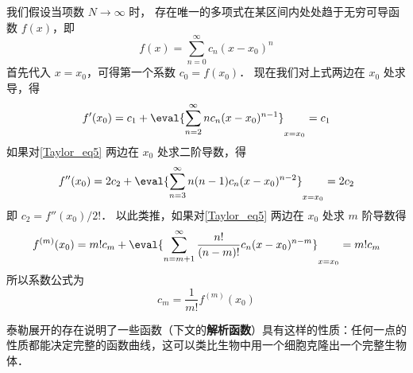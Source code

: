 我们假设当项数 $N \to \infty$ 时， 存在唯一的多项式在某区间内处处趋于无穷可导函数 $f(x)$，即
\begin{equation}\label{Taylor_eq5}
f(x) = \sum_{n = 0}^\infty  c_n (x - x_0)^n
\end{equation}
首先代入 $x = x_0$，可得第一个系数 $c_0 = f(x_0)$． 现在我们对上式两边在 $x_0$ 处求导，得
\begin{equation}
f'(x_0) = c_1 + \eval{ \sum_{n = 2}^\infty n c_n (x - x_0)^{n - 1} }_{x = x_0}  = c_1
\end{equation}
如果对\autoref{Taylor_eq5} 两边在 $x_0$ 处求二阶导数，得
\begin{equation}
f''(x_0) = 2 c_2 + \eval{ \sum_{n = 3}^\infty  n(n - 1) c_n (x - x_0)^{n - 2} }_{x = x_0}  = 2 c_2
\end{equation}
即 $c_2 = f''(x_0)/2!$．  以此类推，如果对\autoref{Taylor_eq5} 两边在 $x_0$ 处求 $m$ 阶导数得
\begin{equation}
f^{(m)}(x_0) = m! c_m + \eval{ \sum_{n = m + 1}^\infty  \frac{n!}{(n - m)!} c_n (x - x_0)^{n - m} }_{x = x_0}  = m! c_m
\end{equation}
所以系数公式为
\begin{equation}
{c_m} = \frac{1}{m!} f^{(m)}(x_0)
\end{equation}

泰勒展开的存在说明了一些函数（下文的\textbf{解析函数}）具有这样的性质：任何一点的性质都能决定完整的函数曲线，这可以类比生物中用一个细胞克隆出一个完整生物体．

